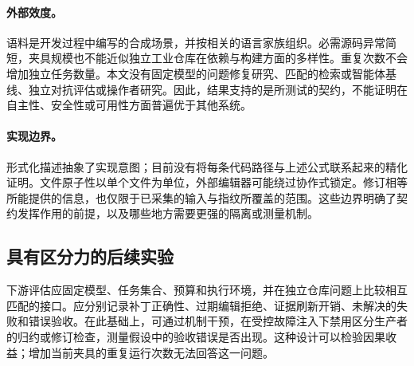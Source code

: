\paragraph{外部效度。}
语料是开发过程中编写的合成场景，并按相关的语言家族组织。必需源码异常简短，夹具规模也不能近似独立工业仓库在依赖与构建方面的多样性。重复次数不会增加独立任务数量。本文没有固定模型的问题修复研究、匹配的检索或智能体基线、独立对抗评估或操作者研究。因此，结果支持的是所测试的契约，不能证明在自主性、安全性或可用性方面普遍优于其他系统。

\paragraph{实现边界。}
形式化描述抽象了实现意图；目前没有将每条代码路径与上述公式联系起来的精化证明。文件原子性以单个文件为单位，外部编辑器可能绕过协作式锁定。修订相等所能提供的信息，也仅限于已采集的输入与指纹所覆盖的范围。这些边界明确了契约发挥作用的前提，以及哪些地方需要更强的隔离或测量机制。

\subsection{具有区分力的后续实验}
下游评估应固定模型、任务集合、预算和执行环境，并在独立仓库问题上比较相互匹配的接口。应分别记录补丁正确性、过期编辑拒绝、证据刷新开销、未解决的失败和错误验收。在此基础上，可通过机制干预，在受控故障注入下禁用区分生产者的归约或修订检查，测量假设中的验收错误是否出现。这种设计可以检验因果收益；增加当前夹具的重复运行次数无法回答这一问题。
